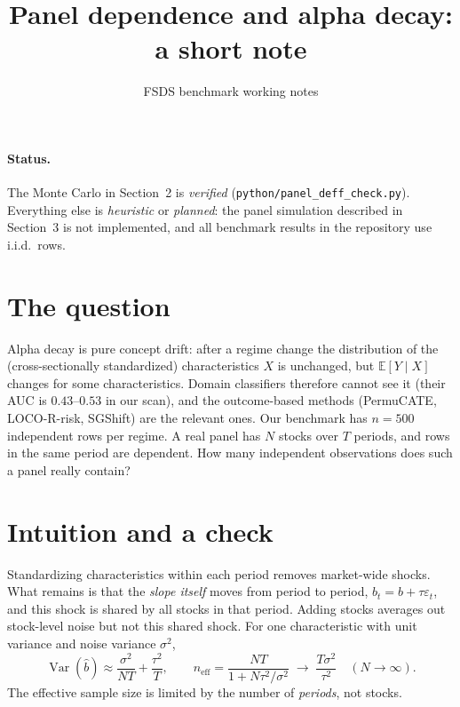 \documentclass[11pt]{article}
\title{Panel dependence and alpha decay: a short note}
\author{FSDS benchmark working notes}
\date{}
\begin{document}
\maketitle

\paragraph{Status.}
The Monte Carlo in Section~2 is \emph{verified} (\texttt{python/panel\_deff\_check.py}). Everything else is \emph{heuristic} or \emph{planned}: the panel simulation described in Section~3 is not implemented, and all benchmark results in the repository use i.i.d.\ rows.

\section{The question}
Alpha decay is pure concept drift: after a regime change the distribution of the (cross-sectionally standardized) characteristics $X$ is unchanged, but $\mathbb{E}[Y\mid X]$ changes for some characteristics. Domain classifiers therefore cannot see it (their AUC is $0.43$--$0.53$ in our scan), and the outcome-based methods (PermuCATE, LOCO-R-risk, SGShift) are the relevant ones.
Our benchmark has $n=500$ independent rows per regime. A real panel has $N$ stocks over $T$ periods, and rows in the same period are dependent. How many independent observations does such a panel really contain?

\section{Intuition and a check}
Standardizing characteristics within each period removes market-wide shocks. What remains is that the \emph{slope itself} moves from period to period, $b_t = b + \tau\varepsilon_t$, and this shock is shared by all stocks in that period. Adding stocks averages out stock-level noise but not this shared shock. For one characteristic with unit variance and noise variance $\sigma^2$,
\begin{equation}
\operatorname{Var}(\hat b)\approx \frac{\sigma^2}{NT}+\frac{\tau^2}{T},
\qquad
n_{\text{eff}}=\frac{NT}{1+N\tau^2/\sigma^2}\;\longrightarrow\;\frac{T\sigma^2}{\tau^2}\quad (N\to\infty).
\end{equation}
The effective sample size is limited by the number of \emph{periods}, not stocks.
\end{document}
